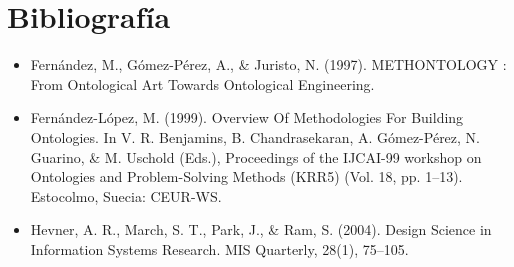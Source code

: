 \chapter*{\Large Bibliografía}


\pagestyle{fancy}
\renewcommand{\sectionmark}[1]{\markright{#1}}

\lhead{}
\chead{}
\lfoot{}
\cfoot{}
\rfoot{\thepage}
\renewcommand{\headrulewidth}{0.4pt}

\begin{itemize}
\item Fernández, M., Gómez-Pérez, A., \& Juristo, N. (1997). METHONTOLOGY : From Ontological Art Towards Ontological Engineering.

\item Fernández-López, M. (1999). Overview Of Methodologies For Building Ontologies. In V. R. Benjamins, B. Chandrasekaran, A. Gómez-Pérez, N. Guarino, \& M. Uschold (Eds.), Proceedings of the IJCAI-99 workshop on Ontologies and Problem-Solving Methods (KRR5) (Vol. 18, pp. 1–13). Estocolmo, Suecia: CEUR-WS.

\item Hevner, A. R., March, S. T., Park, J., \& Ram, S. (2004). Design Science in Information Systems Research. MIS Quarterly, 28(1), 75–105.
\end{itemize}



